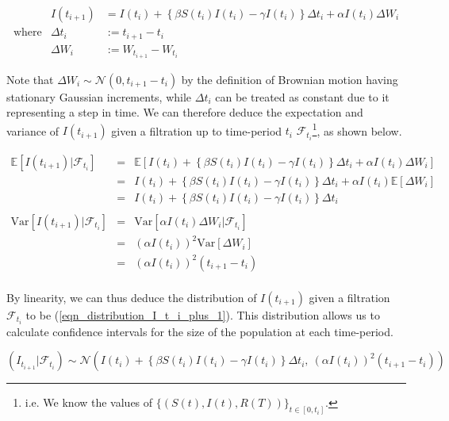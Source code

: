\documentclass[11pt,a4paper]{article}
\newcommand*{\expect}{\mathbb{E}}
\newcommand*{\var}{\text{Var}}
\theoremstyle{break}
\begin{document}
  \begin{equation}\label{eqn_approximate_numerical_stochastic_I}
    \begin{array}{rrl}
      &I(t_{i+1})&=I(t_i)+\left\{\beta S(t_i)I(t_i)-\gamma I(t_i)\right\}\Delta t_i+\alpha I(t_i)\Delta W_i\\
      \text{where}&\Delta t_i&:=t_{i+1}-t_i\\
      &\Delta W_i&:=W_{t_{i+1}}-W_{t_i}
    \end{array}
  \end{equation}

  \par Note that $\Delta W_i\sim\mathcal{N}(0,t_{i+1}-t_i)$ by the definition of Brownian motion having stationary Gaussian increments, while $\Delta t_i$ can be treated as constant due to it representing a step in time. We can therefore deduce the expectation and variance of $I(t_{i+1})$ given a filtration up to time-period $t_i$ $\mathcal{F}_{t_i}$\footnote{i.e. We know the values of $\{(S(t),I(t),R(T))\}_{t\in[0,t_i]}$.}, as shown below.

  \[\begin{array}{rcl}
    \expect\left[I(t_{i+1})|\mathcal{F}_{t_i}\right]&=&\expect\left[I(t_i)+\left\{\beta S(t_i)I(t_i)-\gamma I(t_i)\right\}\Delta t_i+\alpha I(t_i)\Delta W_i\right]\\
    &=&I(t_i)+\left\{\beta S(t_i)I(t_i)-\gamma I(t_i)\right\}\Delta t_i+\alpha I(t_i)\expect\left[\Delta W_i\right]\\
    &=&I(t_i)+\left\{\beta S(t_i)I(t_i)-\gamma I(t_i)\right\}\Delta t_i\\
    \\
    \var\left[I(t_{i+1})|\mathcal{F}_{t_i}\right]&=&\var\left[\alpha I(t_i)\Delta W_i|\mathcal{F}_{t_i}\right]\\
    &=&(\alpha I(t_i))^2\var[\Delta W_i]\\
    &=&(\alpha I(t_i))^2(t_{i+1}-t_i)\\
  \end{array}\]

  \par By linearity, we can thus deduce the distribution of $I(t_{i+1})$ given a filtration $\mathcal{F}_{t_i}$ to be (\ref{eqn_distribution_I_t_i_plus_1}). This distribution allows us to calculate confidence intervals for the size of the population at each time-period.

  \begin{equation}\label{eqn_distribution_I_t_i_plus_1}
    (I_{t_{i+1}}|\mathcal{F}_{t_i})\sim\mathcal{N}\left(I(t_i)+\left\{\beta S(t_i)I(t_i)-\gamma I(t_i)\right\}\Delta t_i,\ (\alpha I(t_i))^2(t_{i+1}-t_i)\right)
  \end{equation}
\end{document}
